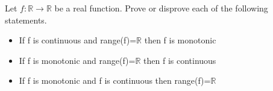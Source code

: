 Let \(f\colon  \mathbb{R}\to \mathbb{R}\) be a real function. Prove or disprove each of the following statements.\begin{itemize}

\item[(a)] If f is continuous and range(f)=\(\mathbb{R}\) then f is monotonic
\item[(b)] If f is monotonic and range(f)=\(\mathbb{R}\) then f is continuous
\item[(c)] If f is monotonic and f is continuous then range(f)=\(\mathbb{R}\)
\end{itemize}

